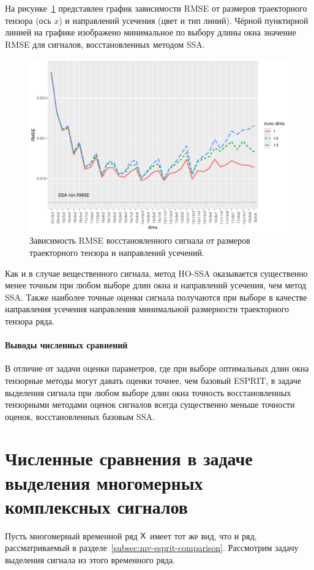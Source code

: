 \documentclass[specialist,
  substylefile=spbu_report.rtx,
subf,href,colorlinks=true, 12pt]{disser}
\theoremstyle{plain}
\theoremstyle{definition}
\theoremstyle{remark}
\begin{document}
На рисунке~\ref{fig:rec-dims} представлен график зависимости RMSE от размеров
траекторного тензора (ось $x$) и направлений усечения (цвет и тип линий).
Чёрной пунктирной линией на графике изображено минимальное по
выбору длины окна
значение RMSE для сигналов, восстановленных методом SSA.
\begin{figure}[!ht]
  \centering
  \includegraphics[width=\textwidth, height=0.38\textheight]{rec_dim_rmse}
  \caption{Зависимость RMSE восстановленного сигнала от размеров
    траекторного тензора
  и направлений усечений.}\label{fig:rec-dims}
\end{figure}
Как и в случае вещественного сигнала, метод HO-SSA оказывается
существенно менее точным при
любом выборе длин окна и направлений усечения, чем метод SSA.
Также наиболее точные оценки сигнала получаются при выборе в качестве
направления усечения направления минимальной размерности траекторного
тензора ряда.

\paragraph{Выводы численных сравнений}
В отличие от задачи оценки параметров, где при выборе оптимальных длин окна
тензорные методы могут давать оценки точнее, чем базовый ESPRIT, в
задаче выделения
сигнала при любом выборе длин окна точность восстановленных тензорными
методами оценок сигналов всегда существенно меньше точности оценок,
восстановленных
базовым SSA.

\section{Численные сравнения в задаче выделения многомерных
комплексных сигналов}\label{sec:cmssa-comparison}
Пусть многомерный временной ряд $\mathsf{X}$ имеет тот же вид, что и ряд,
рассматриваемый в разделе~\ref{subsec:mv-esprit-comparison}.
Рассмотрим задачу выделения сигнала из этого временного ряда.
\end{document}
